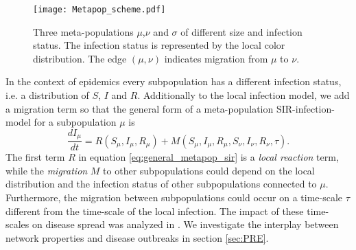 \begin{SCfigure}
\texttt{[image: Metapop\_scheme.pdf]}
\caption{Three meta-populations $\mu $,$\nu $ and $\sigma $ of different size and infection status.
The infection status is represented by the local color distribution.
The edge $(\mu, \nu )$ indicates migration from $\mu $ to $\nu $.}
\label{fig:metapop_scheme}
\end{SCfigure}

In the context of epidemics every subpopulation has a different infection status, i.e. a distribution of $S$, $I$ and $R$.
Additionally to the local infection model, we add a migration term so that the general form of a meta-population SIR-infection-model for a subpopulation $\mu $ is
\begin{equation}\label{eq:general_metapop_sir}
\frac{dI_\mu }{dt} = R(S_\mu, I_\mu , R_\mu) + M (S_\mu, I_\mu , R_\mu, S_\nu ,I_\nu ,R_\nu, \tau ).
\end{equation}
The first term $R$ in equation \eqref{eq:general_metapop_sir} is a \emph{local reaction} term, while the \emph{migration} $M$ to other subpopulations could depend on the local distribution and the infection status of other subpopulations connected to $\mu $.
Furthermore, the migration between subpopulations could occur on a time-scale $\tau $ different from the time-scale of the local infection.
The impact of these time-scales on disease spread was analyzed in  \citep{cross2005,Balcan:2011gv,Lentz:2012pre}.
We investigate the interplay between network properties and disease outbreaks in section \ref{sec:PRE}. 
%


%
%
%
